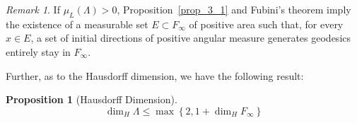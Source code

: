 \documentclass[reqno,11pt]{article}
\newtheorem{proposition}{Proposition}[section]
\theoremstyle{definition}
\theoremstyle{remark}
\newtheorem*{remark}{Remark}
\numberwithin{equation}{section}
\begin{document}
\begin{remark}
	If $\mu_L(\Lambda)>0$, Proposition~\ref{prop_3_1} and Fubini's theorem imply the existence of a measurable set $E\subset F_{\infty}$ of positive area such that, for every $x\in E$, a set of initial directions of positive angular measure generates geodesics entirely stay in $F_{\infty}$.
\end{remark}

Further, as to the Hausdorff dimension, we have the following result:

\begin{proposition}[Hausdorff Dimension]\label{prop_3_2}
	\begin{displaymath}
		\dim_{H}\Lambda \leq \max\left\{2, 1+\dim_{H}F_{\infty}\right\}
	\end{displaymath}
\end{proposition}
\end{document}
